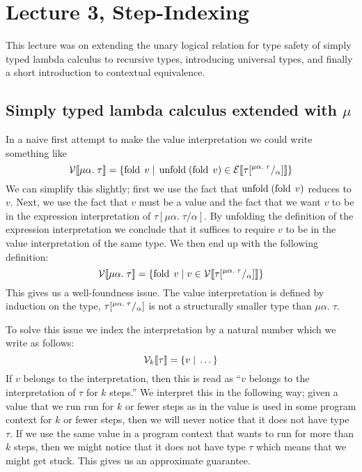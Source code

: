 \section*{Lecture 3, Step-Indexing}
This lecture was on extending the unary logical relation for type safety of simply typed lambda calculus to recursive types, introducing universal types, and finally a short introduction to contextual equivalence.

\subsection*{Simply typed lambda calculus extended with $\mu$}
In a naive first attempt to make the value interpretation we could write something like
\[
  \mathcal{V}\llbracket \mu\alpha. \; \tau \rrbracket = \{\operatorname{fold} \; v \; | \; \operatorname{unfold} \; (\operatorname{fold} \; v) \in \mathcal{E}\llbracket \tau[^{\mu\alpha.\;\tau}/_{\alpha}] \rrbracket \}
\]
We can simplify this slightly; first we use the fact that $\operatorname{unfold} \; (\operatorname{fold} \; v)$ reduces to $v$. Next, we use the fact that $v$ must be a value and the fact that we want $v$ to be in the expression interpretation of $\tau[\mu \alpha. \; \tau / \alpha]$. By unfolding the definition of the expression interpretation we conclude that it suffices to require $v$ to be in the value interpretation of the same type. We then end up with the following definition:
\[
  \mathcal{V}\llbracket \mu\alpha. \; \tau \rrbracket = \{\operatorname{fold} \; v \; | \; v \in \mathcal{V}\llbracket \tau[^{\mu\alpha.\;\tau}/_{\alpha}] \rrbracket \}
\]
This gives us a well-foundness issue. The value interpretation is defined by induction on the type, $\tau[^{\mu\alpha.\;\tau}/_{\alpha}]$ is not a structurally smaller type than $\mu\alpha. \; \tau$. 

To solve this issue we index the interpretation by a natural number which we write as follows:
\[
  \mathcal{V}_{k}\llbracket \tau \rrbracket = \{v \; | \; \dots \}
\]
If $v$ belongs to the interpretation, then this is read as ``$v$ belongs to the interpretation of $\tau$ for $k$ steps.'' We interpret this in the following way; given a value that we run run for $k$ or fewer steps as in the value is used in some program context for $k$ or fewer steps, then we will never notice that it does not have type $\tau$. If we use the same value in a program context that wants to run for more than $k$ steps, then we might notice that it does not have type $\tau$ which means that we might get stuck. This gives us an approximate guarantee.

